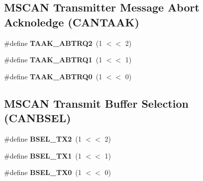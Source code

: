 \subsection*{M\+S\+C\+AN Transmitter Message Abort Acknoledge (C\+A\+N\+T\+A\+AK)}
\begin{DoxyCompactItemize}
\item 
\mbox{\label{group__RTEMSBSPsPowerPCGen5200MSCAN_ga12b494f8aabace1a8896dfaca1b238d1}} 
\#define {\bfseries T\+A\+A\+K\+\_\+\+A\+B\+T\+R\+Q2}~(1 $<$$<$ 2)
\item 
\mbox{\label{group__RTEMSBSPsPowerPCGen5200MSCAN_ga5e95bffce672d62188d619c549797041}} 
\#define {\bfseries T\+A\+A\+K\+\_\+\+A\+B\+T\+R\+Q1}~(1 $<$$<$ 1)
\item 
\mbox{\label{group__RTEMSBSPsPowerPCGen5200MSCAN_ga13d69e8f42877fe42dadc15190de78e7}} 
\#define {\bfseries T\+A\+A\+K\+\_\+\+A\+B\+T\+R\+Q0}~(1 $<$$<$ 0)
\end{DoxyCompactItemize}
\subsection*{M\+S\+C\+AN Transmit Buffer Selection (C\+A\+N\+B\+S\+EL)}
\begin{DoxyCompactItemize}
\item 
\mbox{\label{group__RTEMSBSPsPowerPCGen5200MSCAN_gac06c8db9cdc4fbe8823d1ca165767d78}} 
\#define {\bfseries B\+S\+E\+L\+\_\+\+T\+X2}~(1 $<$$<$ 2)
\item 
\mbox{\label{group__RTEMSBSPsPowerPCGen5200MSCAN_ga2ffa63a45e0f3928280892a27e217258}} 
\#define {\bfseries B\+S\+E\+L\+\_\+\+T\+X1}~(1 $<$$<$ 1)
\item 
\mbox{\label{group__RTEMSBSPsPowerPCGen5200MSCAN_ga7b00ea4dbce6c327a9c45cb61bc1e0bb}} 
\#define {\bfseries B\+S\+E\+L\+\_\+\+T\+X0}~(1 $<$$<$ 0)
\end{DoxyCompactItemize}
